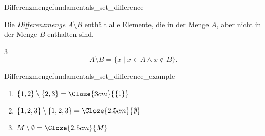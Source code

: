 \noindent\begin{minipage}{\linewidth}
\begin{DefinitionBox}{Differenzmenge}{fundamentals_set_difference}
  \begin{minipage}[c]{0.70\linewidth}
    Die \emph{Differenzmenge}  $A\setminus B$
    enthält alle Elemente, die in der Menge $A$, aber nicht in der Menge $B$
    enthalten sind.
    \begin{ClozeArea}[24]{3}
      \[
        A\setminus B=\{x\mid x\in A\land x\notin B\}.
      \]
    \end{ClozeArea}
  \end{minipage}\hfill
  \begin{minipage}[c]{0.25\linewidth}
    \centering
  \end{minipage}
\end{DefinitionBox}

\begin{ExampleBox}{Differenzmenge}{fundamentals_set_difference_example}
  \begin{enumerate}[label=\alph*),itemsep=0.6em]
    \item $\{1,2\}\setminus\{2,3\}=\Cloze{3cm}{\{1\}}$
    \item $\{1,2,3\}\setminus\{1,2,3\}=\Cloze{2.5cm}{\emptyset}$
    \item $M \setminus \emptyset = \Cloze{2.5cm}{M}$
  \end{enumerate}
\end{ExampleBox}
\end{minipage}
